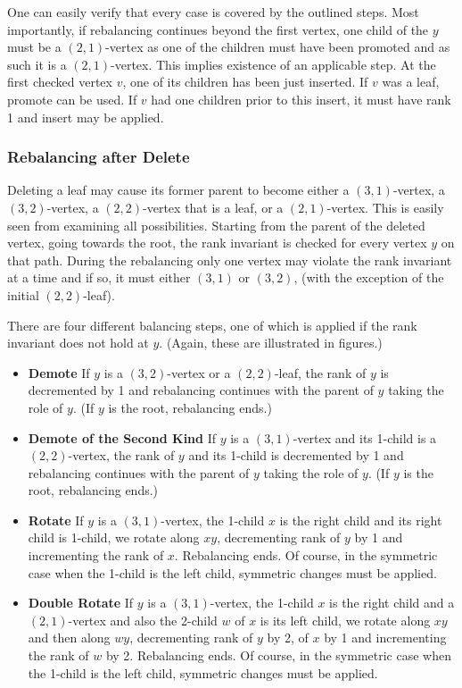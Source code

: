One can easily verify that every case is covered by the outlined steps. Most importantly, if rebalancing continues beyond the first vertex, one child of the $y$ must be a $(2,1)$-vertex as one of the children must have been promoted and as such it is a $(2,1)$-vertex. This implies existence of an applicable step. At the first checked vertex $v$, one of its children has been just inserted. If $v$ was a leaf, promote can be used. If $v$ had one children prior to this insert, it must have rank 1 and insert may be applied. 



\subsubsection*{Rebalancing after Delete}

Deleting a leaf may cause its former parent to become either a $(3,1)$-vertex, a $(3,2)$-vertex, a $(2,2)$-vertex that is a leaf, or a $(2,1)$-vertex. This is easily seen from examining all possibilities. Starting from the parent of the deleted vertex, going towards the root, the rank invariant is checked for every vertex $y$ on that path.  During the rebalancing only one vertex may violate the rank invariant at a time and if so, it must either $(3,1)$ or $(3,2)$, (with the exception of the initial $(2,2)$-leaf).

There are four different balancing steps, one of which is applied if the rank invariant does not hold at $y$. (Again, these are illustrated in figures.)
\begin{itemize}
	\item \textbf{Demote} If $y$ is a $(3,2)$-vertex or a $(2,2)$-leaf, the rank of $y$ is decremented by 1 and rebalancing continues with the parent of $y$ taking the role of $y$. (If $y$ is the root, rebalancing ends.)
	\item \textbf{Demote of the Second Kind} If $y$ is a $(3,1)$-vertex and its 1-child is a $(2,2)$-vertex, the rank of $y$ and its 1-child is decremented by 1 and rebalancing continues with the parent of $y$ taking the role of $y$. (If $y$ is the root, rebalancing ends.)
	\item \textbf{Rotate} If $y$ is a $(3,1)$-vertex, the 1-child $x$ is the right child and its right child is 1-child, we rotate along $xy$, decrementing rank of $y$ by 1 and incrementing the rank of $x$. Rebalancing ends. Of course, in the symmetric case when the 1-child is the left child, symmetric changes must be applied.
	\item \textbf{Double Rotate} If $y$ is a $(3,1)$-vertex, the 1-child $x$ is the right child and a $(2,1)$-vertex and also the 2-child $w$ of $x$ is its left child, we rotate along $xy$ and then along $wy$, decrementing rank of $y$ by 2, of $x$ by 1 and incrementing the rank of $w$ by 2. Rebalancing ends. Of course, in the symmetric case when the 1-child is the left child, symmetric changes must be applied.
\end{itemize}

